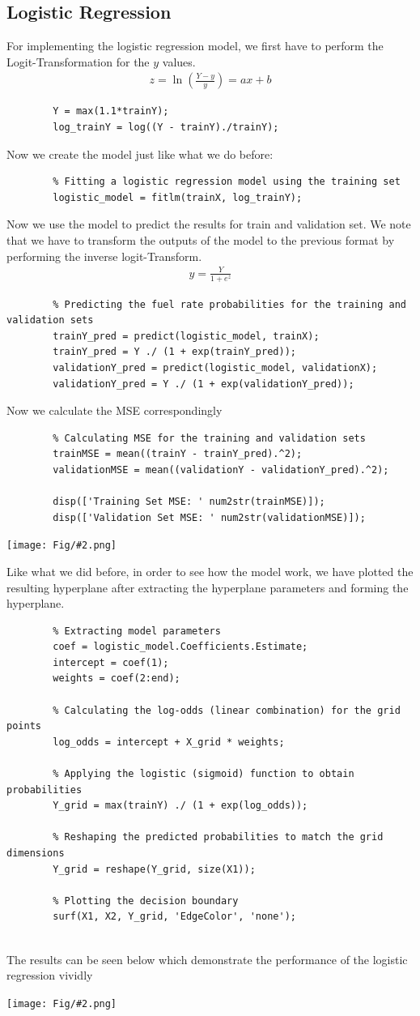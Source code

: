 \documentclass[]{article}
\newcommand{\pict}[2]{\begin{center}
		\texttt{[image: Fig/\#2.png]}
\end{center}}
\begin{document}
	\subsection{Logistic Regression}
	For implementing the logistic regression model, we first have to perform the Logit-Transformation for the $y$ values.
	\begin{align*}
		z = \ln \left(\frac{Y - y}{y}\right) = ax + b
	\end{align*}
	\begin{lstlisting}
		Y = max(1.1*trainY);
		log_trainY = log((Y - trainY)./trainY);
	\end{lstlisting}
	Now we create the model just like what we do before:
	\begin{lstlisting}
		% Fitting a logistic regression model using the training set
		logistic_model = fitlm(trainX, log_trainY);
	\end{lstlisting}
	Now we use the model to predict the results for train and validation set. We note that we have to transform the outputs of the model to the previous format by performing the inverse logit-Transform.
	\begin{align*}
		y = \frac{Y}{1 + e^z}
	\end{align*}
	\begin{lstlisting}
		% Predicting the fuel rate probabilities for the training and validation sets
		trainY_pred = predict(logistic_model, trainX);
		trainY_pred = Y ./ (1 + exp(trainY_pred));
		validationY_pred = predict(logistic_model, validationX);
		validationY_pred = Y ./ (1 + exp(validationY_pred));
	\end{lstlisting}
	Now we calculate the MSE correspondingly
	\begin{lstlisting}
		% Calculating MSE for the training and validation sets
		trainMSE = mean((trainY - trainY_pred).^2);
		validationMSE = mean((validationY - validationY_pred).^2);
		
		disp(['Training Set MSE: ' num2str(trainMSE)]);
		disp(['Validation Set MSE: ' num2str(validationMSE)]);
	\end{lstlisting}
	\pict{0.4}{F4}
	Like what we did before, in order to see how the model work, we have plotted the resulting hyperplane after extracting the hyperplane parameters and forming the hyperplane.
	\begin{lstlisting}
		% Extracting model parameters
		coef = logistic_model.Coefficients.Estimate;
		intercept = coef(1);
		weights = coef(2:end);
		
		% Calculating the log-odds (linear combination) for the grid points
		log_odds = intercept + X_grid * weights;
		
		% Applying the logistic (sigmoid) function to obtain probabilities
		Y_grid = max(trainY) ./ (1 + exp(log_odds));
		
		% Reshaping the predicted probabilities to match the grid dimensions
		Y_grid = reshape(Y_grid, size(X1));
		
		% Plotting the decision boundary
		surf(X1, X2, Y_grid, 'EdgeColor', 'none');
		
	\end{lstlisting}
	The results can be seen below which demonstrate the performance of the logistic regression vividly
	\pict{0.9}{F5}
	
\end{document}

